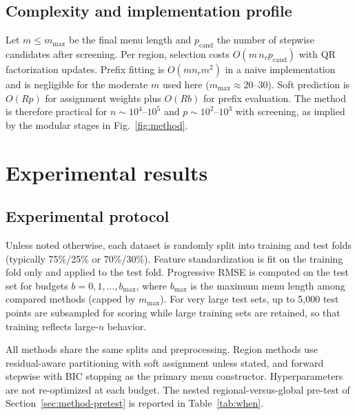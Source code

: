 \documentclass[pdflatex,sn-basic,Numbered]{sn-jnl}
\begin{document}
\subsection{Complexity and implementation profile}

Let \(m\le m_{\max}\) be the final menu length and \(p_{\mathrm{cand}}\) the number of stepwise candidates after screening. Per region, selection costs \(O(m\, n_r p_{\mathrm{cand}})\) with QR factorization updates. Prefix fitting is \(O(m n_r m^2)\) in a naive implementation and is negligible for the moderate \(m\) used here (\(m_{\max}\approx 20\)--\(30\)). Soft prediction is \(O(R p)\) for assignment weights plus \(O(R b)\) for prefix evaluation. The method is therefore practical for \(n\sim 10^4\)--\(10^5\) and \(p\sim 10^2\)--\(10^3\) with screening, as implied by the modular stages in Fig.~\ref{fig:method}.

\section{Experimental results}
\label{sec:experiments}

\subsection{Experimental protocol}

Unless noted otherwise, each dataset is randomly split into training and test folds (typically 75\%/25\% or 70\%/30\%). Feature standardization is fit on the training fold only and applied to the test fold. Progressive RMSE is computed on the test set for budgets \(b=0,1,\ldots,b_{\max}\), where \(b_{\max}\) is the maximum menu length among compared methods (capped by \(m_{\max}\)). For very large test sets, up to 5{,}000 test points are subsampled for scoring while large training sets are retained, so that training reflects large-\(n\) behavior.

All methods share the same splits and preprocessing. Region methods use residual-aware partitioning with soft assignment unless stated, and forward stepwise with BIC stopping as the primary menu constructor. Hyperparameters are not re-optimized at each budget. The nested regional-versus-global pre-test of Section~\ref{sec:method-pretest} is reported in Table~\ref{tab:when}.
\end{document}
